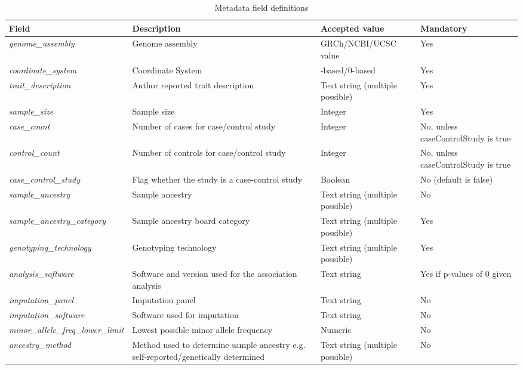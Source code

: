 \documentclass[11pt]{article}
\begin{document}
\begin{table}[h]
 \caption{Metadata field definitions}
 \centering
 \small
 \begin{tabularx}{\textwidth} { 
   | >{\hsize=1.4\hsize\centering\arraybackslash}X 
   | >{\hsize=1\hsize\centering\arraybackslash}X 
   | >{\hsize=1\hsize\centering\arraybackslash}X 
   | >{\hsize=0.6\hsize\centering\arraybackslash}X | } 
  \hline
  Field & Description & Accepted value & Mandatory \\
  \hline
  \textit{genome\_assembly} & Genome assembly & GRCh/NCBI/UCSC value & Yes\\
  \textit{coordinate\_system} & Coordinate System & 1-based/0-based & Yes\\
  \textit{trait\_description} & Author reported trait description & Text string (multiple possible) & Yes\\
  \textit{sample\_size} & Sample size & Integer & Yes\\
  \textit{case\_count} & Number of cases for case/control study & Integer & No, unless caseControlStudy is true\\
  \textit{control\_count} & Number of controls for case/control study & Integer & No, unless caseControlStudy is true\\
  \textit{case\_control\_study} & Flag whether the study is a case-control study & Boolean & No (default is false)\\
  \textit{sample\_ancestry} & Sample ancestry & Text string (multiple possible) & No\\
  \textit{sample\_ancestry\_category} & Sample ancestry board category & Text string (multiple possible) & Yes\\
  \textit{genotyping\_technology} & Genotyping technology & Text string (multiple possible) & Yes\\
  \textit{analysis\_software} & Software and version used for the association analysis & Text string & Yes if p-values of 0 given\\
  \textit{imputation\_panel} & Imputation panel & Text string & No\\
  \textit{imputation\_software} & Software used for imputation & Text string & No\\
  \textit{minor\_allele\_freq\_lower\_limit} & Lowest possible minor allele frequency & Numeric & No\\
  \textit{ancestry\_method} & Method used to determine sample ancestry e.g. self-reported/genetically determined  & Text string (multiple possible) & No\\

\end{tabularx}
\end{table}
\end{document}

